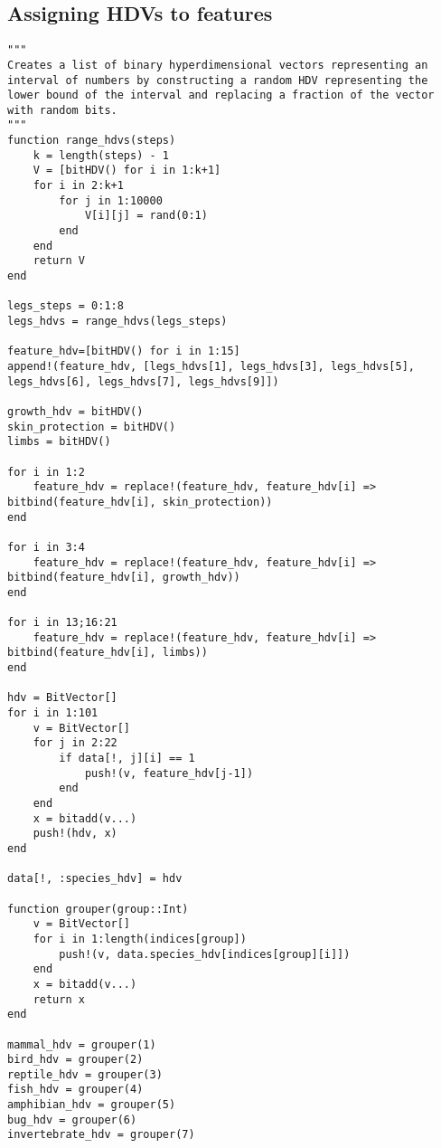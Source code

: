 \subsection{Assigning HDVs to features}
\begin{verbatim}
"""
Creates a list of binary hyperdimensional vectors representing an interval of numbers by constructing a random HDV representing the lower bound of the interval and replacing a fraction of the vector with random bits.
"""
function range_hdvs(steps)
	k = length(steps) - 1
	V = [bitHDV() for i in 1:k+1]
	for i in 2:k+1
		for j in 1:10000
			V[i][j] = rand(0:1)
		end
	end
	return V
end

legs_steps = 0:1:8
legs_hdvs = range_hdvs(legs_steps)

feature_hdv=[bitHDV() for i in 1:15]
append!(feature_hdv, [legs_hdvs[1], legs_hdvs[3], legs_hdvs[5], legs_hdvs[6], legs_hdvs[7], legs_hdvs[9]])

growth_hdv = bitHDV()
skin_protection = bitHDV()
limbs = bitHDV()

for i in 1:2
    feature_hdv = replace!(feature_hdv, feature_hdv[i] => bitbind(feature_hdv[i], skin_protection))
end

for i in 3:4
    feature_hdv = replace!(feature_hdv, feature_hdv[i] => bitbind(feature_hdv[i], growth_hdv))
end

for i in 13;16:21
    feature_hdv = replace!(feature_hdv, feature_hdv[i] => bitbind(feature_hdv[i], limbs))
end

hdv = BitVector[]
for i in 1:101
    v = BitVector[]
    for j in 2:22
        if data[!, j][i] == 1
            push!(v, feature_hdv[j-1])
        end
    end
    x = bitadd(v...)
    push!(hdv, x)
end

data[!, :species_hdv] = hdv

function grouper(group::Int)
    v = BitVector[]
    for i in 1:length(indices[group])
        push!(v, data.species_hdv[indices[group][i]])
    end
    x = bitadd(v...)
    return x
end

mammal_hdv = grouper(1)
bird_hdv = grouper(2)
reptile_hdv = grouper(3)
fish_hdv = grouper(4)
amphibian_hdv = grouper(5)
bug_hdv = grouper(6)
invertebrate_hdv = grouper(7)
\end{verbatim}
